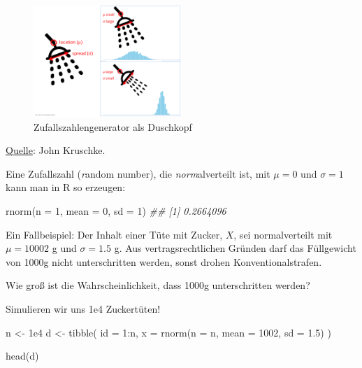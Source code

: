 \documentclass[
  a4paper,
  DIV=11]{scrreprt}
\newenvironment{Shaded}{\begin{snugshade}}{\end{snugshade}}
\newcommand{\AttributeTok}[1]{\textcolor[rgb]{0.40,0.45,0.13}{#1}}
\newcommand{\DecValTok}[1]{\textcolor[rgb]{0.68,0.00,0.00}{#1}}
\newcommand{\DocumentationTok}[1]{\textcolor[rgb]{0.37,0.37,0.37}{\textit{#1}}}
\newcommand{\FloatTok}[1]{\textcolor[rgb]{0.68,0.00,0.00}{#1}}
\newcommand{\FunctionTok}[1]{\textcolor[rgb]{0.28,0.35,0.67}{#1}}
\newcommand{\NormalTok}[1]{\textcolor[rgb]{0.00,0.23,0.31}{#1}}
\newcommand{\OtherTok}[1]{\textcolor[rgb]{0.00,0.23,0.31}{#1}}
\newcommand{\SpecialCharTok}[1]{\textcolor[rgb]{0.37,0.37,0.37}{#1}}
\theoremstyle{definition}
\theoremstyle{remark}
\begin{document}
\begin{figure}

{\centering \includegraphics[width=0.5\textwidth,height=\textheight]{./img/shower-data.png}

}

\caption{\label{fig-shower}Zufallszahlengenerator als Duschkopf}

\end{figure}

\href{https://jkkweb.sitehost.iu.edu/KruschkeFreqAndBayesAppTutorial.html\#data_are_described_by_mathematical_models}{Quelle}:
John Kruschke.

Eine Zufallszahl (\emph{r}andom number), die \emph{norm}alverteilt ist,
mit \(\mu=0\) und \(\sigma=1\) kann man in R so erzeugen:

\begin{Shaded}
\begin{Highlighting}[]
\FunctionTok{rnorm}\NormalTok{(}\AttributeTok{n =} \DecValTok{1}\NormalTok{, }\AttributeTok{mean =} \DecValTok{0}\NormalTok{, }\AttributeTok{sd =} \DecValTok{1}\NormalTok{)}
\DocumentationTok{\#\# [1] 0.2664096}
\end{Highlighting}
\end{Shaded}

Ein Fallbeispiel: Der Inhalt einer Tüte mit Zucker, \(X\), sei
normalverteilt mit \(\mu = 10002\) g und \(\sigma=1.5\) g. Aus
vertragsrechtlichen Gründen darf das Füllgewicht von 1000g nicht
unterschritten werden, sonst drohen Konventionalstrafen.

Wie groß ist die Wahrscheinlichkeit, dass 1000g unterschritten werden?

Simulieren wir uns 1e4 Zuckertüten!

\begin{Shaded}
\begin{Highlighting}[]
\NormalTok{n }\OtherTok{\textless{}{-}} \FloatTok{1e4}
\NormalTok{d }\OtherTok{\textless{}{-}} 
  \FunctionTok{tibble}\NormalTok{(}
    \AttributeTok{id =} \DecValTok{1}\SpecialCharTok{:}\NormalTok{n,}
    \AttributeTok{x =} \FunctionTok{rnorm}\NormalTok{(}\AttributeTok{n =}\NormalTok{ n, }\AttributeTok{mean =} \DecValTok{1002}\NormalTok{, }\AttributeTok{sd =} \FloatTok{1.5}\NormalTok{)}
\NormalTok{  )}

\FunctionTok{head}\NormalTok{(d)}
\end{Highlighting}
\end{Shaded}
\end{document}
